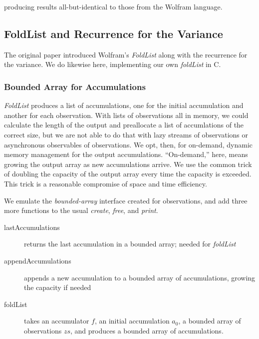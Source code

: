 \documentclass[10pt,oneside,x11names]{article}
\begin{document}
\noindent producing results all-but-identical to those from the Wolfram language.

\subsection{FoldList and Recurrence for the Variance}
\label{sec:orgheadline14}

The original paper introduced Wolfram's \emph{FoldList} along with the recurrence for
the variance. We do likewise here, implementing our own \emph{foldList} in C.

\subsubsection{Bounded Array for Accumulations}
\label{sec:orgheadline12}

\emph{FoldList} produces a list of accumulations, one for the initial accumulation
and another for each observation. With lists of observations all in memory, we
could calculate the length of the output and preallocate a list of accumlations
of the correct size, but we are not able to do that with lazy streams of
observations or asynchronous observables of observations. We opt, then, for
on-demand, dynamic memory management for the output accumulations.
``On-demand,'' here, means growing the output array as new accumulations arrive.
We use the common trick of doubling the capacity of the output array every time
the capacity is exceeded. This trick is a reasonable compromise of space and
time efficiency.

We emulate the \emph{bounded-array} interface created for observations, and add three
more functions to the usual \emph{create}, \emph{free}, and \emph{print}.
\begin{description}
\item[{lastAccumulations}] returns the last accumulation in a bounded array; needed for
\emph{foldList}
\item[{appendAccumulations}] appends a new accumulation to a bounded array of
accumulations, growing the capacity if needed
\item[{foldList}] takes an accumulator \(f\), an initial accumulation \(a_0\), a bounded
array of observations \(zs\), and produces a bounded array of accumulations.
\end{description}
\end{document}
